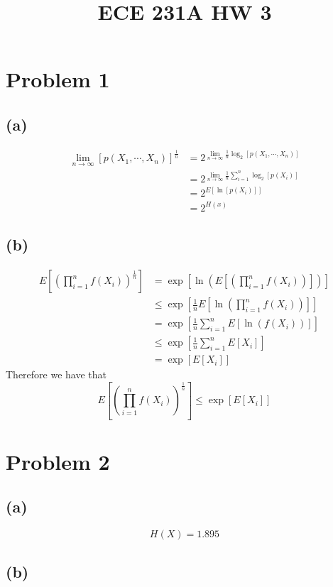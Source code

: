 
\title{ECE 231A HW 3}

\maketitle
\section*{Problem 1}
\subsection*{(a)}
\begin{align*}
    \lim_{n\to\infty}[p(X_1,\cdots,X_n)]^{\frac{1}{n}}&=
        2^{\lim_{n\to\infty}\frac{1}{n}\log_2[p(X_1,\cdots,X_n)]}\\
    &=2^{\lim_{n\to\infty}\frac{1}{n}\sum_{i=1}^n\log_2[p(X_i)]}\\
    &=2^{E[\ln[p(X_i)]]}\\
    &=\boxed{2^{H(x)}}
\end{align*}
\subsection*{(b)}
\begin{align*}
    E\left[\left(\prod_{i=1}^nf(X_i)\right)^{\frac{1}{n}}\right]&=
        \exp\left[\ln\left(E\left[\left(\prod_{i=1}^nf(X_i)\right)\right]\right)\right]\\
    &\leq \exp\left[\frac{1}{n}E\left[\ln\left(\prod_{i=1}^nf(X_i)\right)\right]\right]\\
    &=\exp\left[\frac{1}{n}\sum_{i=1}^nE\left[\ln\left(f(X_i)\right)\right]\right]\\
    &\leq \exp\left[\frac{1}{n}\sum_{i=1}^nE[X_i]\right]\\
    &=\exp\left[E[X_i]\right]
\end{align*}
Therefore we have that
$$
    \boxed{E\left[\left(\prod_{i=1}^nf(X_i)\right)^{\frac{1}{n}}\right]\leq \exp\left[E[X_i]\right]}
    $$
\section*{Problem 2}
\subsection*{(a)}
$$H(X)=\boxed{1.895}$$
\subsection*{(b)}

